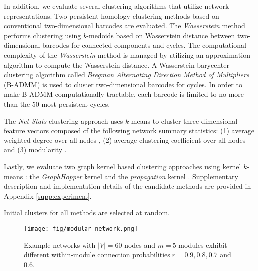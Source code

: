 \documentclass{article} %
\begin{document}
In addition, we evaluate several clustering algorithms that utilize network representations.
Two persistent homology clustering methods based on conventional two-dimensional barcodes \citep{otter2017roadmap} are evaluated. The {\em Wasserstein} method performs clustering using $k$-medoids based on Wasserstein distance between two-dimensional barcodes for connected components and cycles. The computational complexity of the {\em Wasserstein} method is managed by utilizing an approximation algorithm \citep{Lacombe2018LargeSC} to compute the Wasserstein distance. A Wasserstein barycenter clustering algorithm called {\em Bregman Alternating Direction Method of Multipliers} (B-ADMM) \citep{ye2017fast} is used to cluster two-dimensional barcodes for cycles. In order to make B-ADMM computationally tractable, each barcode is limited to no more than the 50 most persistent cycles. 

The {\em Net Stats} clustering approach uses $k$-means to cluster  three-dimensional feature vectors composed of the following network summary statistics: (1) average weighted degree over all nodes \citep{rubinov2010complex}, (2) average clustering coefficient over all nodes \citep{rubinov2010complex} and (3) modularity \citep{newman2006modularity,reichardt2006statistical}.

Lastly, we evaluate two graph kernel based clustering approaches using kernel $k$-means \citep{dhillon2004kernel}: the {\em GraphHopper} kernel \citep{feragen2013scalable} and the {\em propagation} kernel \citep{neumann2016propagation}. Supplementary description and implementation details of the candidate methods are provided in Appendix \ref{supp:experiment}.

Initial clusters for all methods are selected at random.


\begin{wrapfigure}{R}{0.29\textwidth}
\vspace{-30pt}
\centering
\texttt{[image: fig/modular\_network.png]}
\vspace{-15pt}
\caption{\small Example networks with $|V|=60$ nodes and $m=5$ modules exhibit different within-module connection probabilities $r = 0.9,0.8,0.7$ and $0.6$.
}
\vspace{-25pt}
\label{fig:modular_2net}
\end{wrapfigure}
\end{document}
